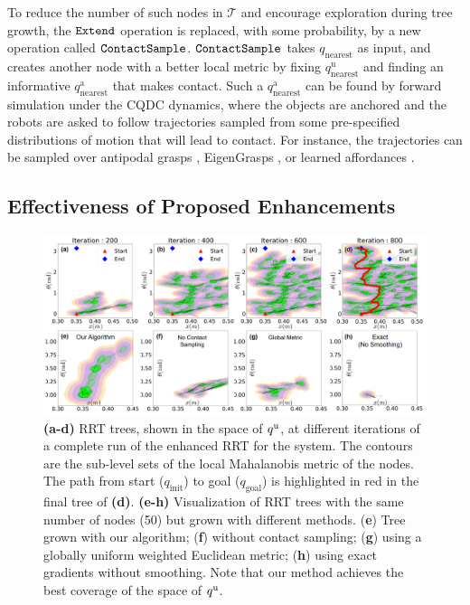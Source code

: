 To reduce the number of such nodes in $\mathcal{T}$ and encourage exploration during tree growth, the $\mathtt{Extend}$ operation is replaced, with some probability, by a new operation called $\mathtt{ContactSample}$. $\mathtt{ContactSample}$ takes $q_\mathrm{nearest}$ as input, and creates another node with a better local metric by fixing $q_\mathrm{nearest}^\mathrm{u}$ and finding an informative $q_\mathrm{nearest}^\mathrm{a}$ that makes contact. Such a $q_\mathrm{nearest}^\mathrm{a}$ can be found by forward simulation under the CQDC dynamics, where the objects are anchored and the robots are asked to follow trajectories sampled from some pre-specified distributions of motion that will lead to contact. For instance, the trajectories can be sampled over antipodal grasps \cite{antipodal}, EigenGrasps \cite{eigengrasp}, or learned affordances \cite{kpam}. 

\subsection{Effectiveness of Proposed Enhancements \label{sec:rrt_contact_effectiveness}}

\begin{figure}
\centering\includegraphics[width = 1.0\textwidth]{figures/03_contact_rich_planning/iteration_plot_combined_horizontal.png}
\caption{\textbf{(a-d)} RRT trees, shown in the space of ${q^\mathrm{u}}$, at different iterations of a complete run of the enhanced RRT for the  system. The contours are the sub-level sets of the local Mahalanobis metric of the nodes. The path from start ($q_\mathrm{init}$) to goal ($q_\mathrm{goal}$) is highlighted in red in the final tree of \textbf{(d)}. \textbf{(e-h)} Visualization of RRT trees with the same number of nodes (50) but grown with different methods. (\textbf{e}) Tree grown with our algorithm; (\textbf{f}) without contact sampling; (\textbf{g}) using a globally uniform weighted Euclidean metric; (\textbf{h}) using exact gradients without smoothing. Note that our method achieves the best coverage of the space of ${q^\mathrm{u}}$.}
\label{fig:degenerate}
\end{figure}

